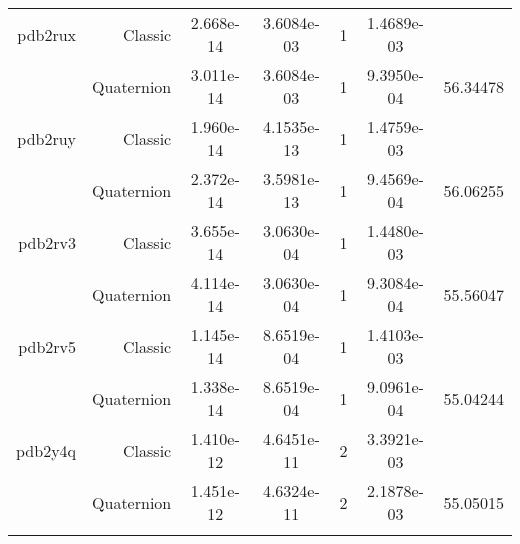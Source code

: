 \begin{xltabular}{\textwidth}{r|rS[table-format=1.3e+2]S[table-format=1.4e+2]cS[table-format=1.4e+2]S[table-format=-1.5]}
pdb2rux & Classic & 2.668e-14 & 3.6084e-03 & 1 & 1.4689e-03 & \\
& Quaternion & 3.011e-14 & 3.6084e-03 & 1 & 9.3950e-04 & 56.34478\\  \addlinespace
pdb2ruy & Classic & 1.960e-14 & 4.1535e-13 & 1 & 1.4759e-03 & \\
& Quaternion & 2.372e-14 & 3.5981e-13 & 1 & 9.4569e-04 & 56.06255\\  \addlinespace
pdb2rv3 & Classic & 3.655e-14 & 3.0630e-04 & 1 & 1.4480e-03 & \\
& Quaternion & 4.114e-14 & 3.0630e-04 & 1 & 9.3084e-04 & 55.56047\\  \addlinespace
pdb2rv5 & Classic & 1.145e-14 & 8.6519e-04 & 1 & 1.4103e-03 & \\
& Quaternion & 1.338e-14 & 8.6519e-04 & 1 & 9.0961e-04 & 55.04244\\  \addlinespace
pdb2y4q & Classic & 1.410e-12 & 4.6451e-11 & 2 & 3.3921e-03 & \\
& Quaternion & 1.451e-12 & 4.6324e-11 & 2 & 2.1878e-03 & 55.05015\\  \addlinespace
\end{xltabular}
